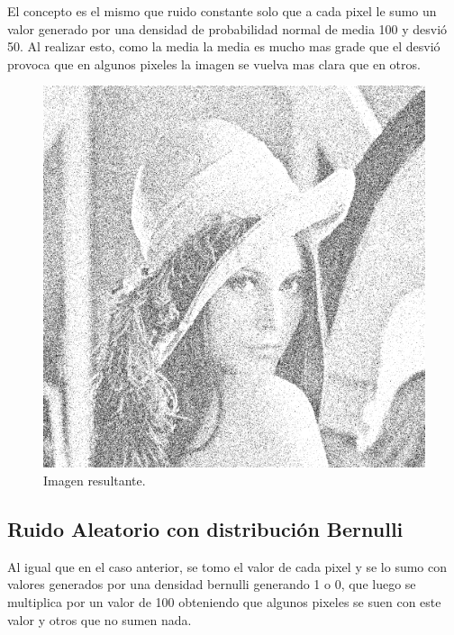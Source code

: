 El concepto es el mismo que ruido constante solo que a cada pixel le sumo un valor generado por una densidad de probabilidad normal de media 100 y desvió 50. Al realizar esto, como la media la media es mucho mas grade que el desvió provoca que en algunos pixeles la imagen se vuelva mas clara que en otros.


\begin{figure}[H]
	\centering
	\includegraphics[scale=0.5]{imagenes/ruidoAleatorioNormal.png}

	\caption{Imagen resultante.}
\end{figure}

\subsection{Ruido Aleatorio con distribución Bernulli}

Al igual que en el caso anterior, se tomo el valor de cada pixel y se lo sumo con valores generados por una densidad bernulli generando 1 o 0, que luego se multiplica por un valor de 100 obteniendo que algunos pixeles se suen con este valor y otros que no sumen nada.

